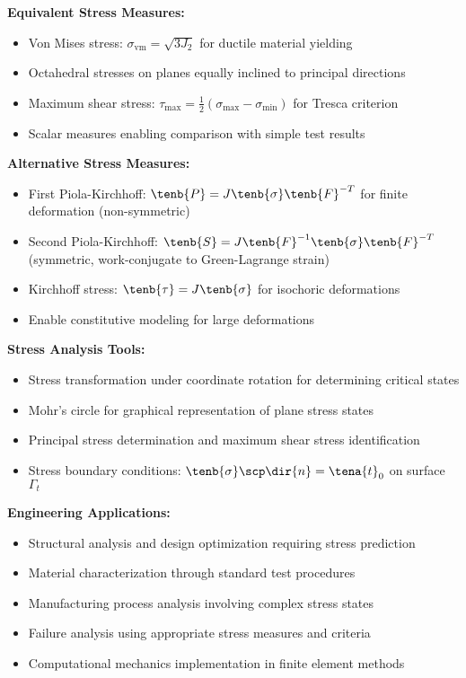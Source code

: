 \begin{subox}[Summary]
\textbf{Equivalent Stress Measures:}
\begin{itemize}
\item Von Mises stress: $\sigma_{\text{vm}} = \sqrt{3J_2}$ for ductile material yielding
\item Octahedral stresses on planes equally inclined to principal directions
\item Maximum shear stress: $\tau_{\text{max}} = \frac{1}{2}(\sigma_{\text{max}} - \sigma_{\text{min}})$ for Tresca criterion
\item Scalar measures enabling comparison with simple test results
\end{itemize}

\textbf{Alternative Stress Measures:}
\begin{itemize}
\item First Piola-Kirchhoff: $\tenb{P} = J\tenb{\sigma}\tenb{F}^{-T}$ for finite deformation (non-symmetric)
\item Second Piola-Kirchhoff: $\tenb{S} = J\tenb{F}^{-1}\tenb{\sigma}\tenb{F}^{-T}$ (symmetric, work-conjugate to Green-Lagrange strain)
\item Kirchhoff stress: $\tenb{\tau} = J\tenb{\sigma}$ for isochoric deformations
\item Enable constitutive modeling for large deformations
\end{itemize}

\textbf{Stress Analysis Tools:}
\begin{itemize}
\item Stress transformation under coordinate rotation for determining critical states
\item Mohr's circle for graphical representation of plane stress states
\item Principal stress determination and maximum shear stress identification
\item Stress boundary conditions: $\tenb{\sigma} \scp \dir{n} = \tena{t}_0$ on surface $\Gamma_t$
\end{itemize}

\textbf{Engineering Applications:}
\begin{itemize}
\item Structural analysis and design optimization requiring stress prediction
\item Material characterization through standard test procedures
\item Manufacturing process analysis involving complex stress states
\item Failure analysis using appropriate stress measures and criteria
\item Computational mechanics implementation in finite element methods
\end{itemize}


\end{subox}
